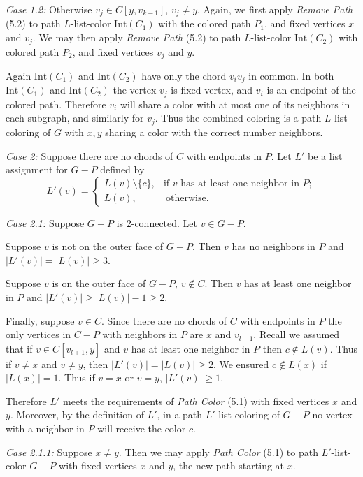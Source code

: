 \documentclass[letterpaper, 12pt]{article}
\theoremstyle{thm}
\begin{document}
\textit{Case 1.2:} Otherwise $v_j\in C[y,v_{k-1}]$, $v_j\ne y$. Again, we first
apply \textit{Remove Path} (5.2) to path $L$-list-color $\text{Int}(C_1)$ with
the colored path $P_1$, and fixed vertices $x$ and $v_j$.
We may then apply \textit{Remove Path} (5.2) to path $L$-list-color
$\text{Int}(C_2)$ with colored path $P_2$, and fixed vertices $v_j$ and $y$.

Again $\text{Int}(C_1)$ and $\text{Int}(C_2)$ have only the chord $v_iv_j$ in
common. In both $\text{Int}(C_1)$ and $\text{Int}(C_2)$ the vertex $v_j$ is
fixed vertex, and $v_i$ is an endpoint of the colored path. Therefore $v_i$ will
share a color with at most one of its neighbors in each subgraph, and similarly
for $v_j$. Thus the
combined coloring is a path $L$-list-coloring of $G$ with $x,y$ sharing a color
with the correct number neighbors.

\textit{Case 2:} Suppose there are no chords of $C$ with endpoints in $P$.
Let $L'$ be a list assignment for $G-P$ defined by
\[
	L'(v) = \begin{cases}
				L(v)\setminus\{c\}, & \text{if } v \text{ has at least one
				    neighbor in } P;\\
				L(v), & \ \text{otherwise}.
			\end{cases}
\]

\textit{Case 2.1:} Suppose $G-P$ is $2$-connected. Let $v\in G-P$.

Suppose $v$ is not on the outer face of $G-P$. Then $v$ has no neighbors in $P$
and $|L'(v)|=\big|L(v)\big|\ge 3$.

Suppose $v$ is on the outer face of $G-P$, $v\not\in C$. Then $v$ has at
least one neighbor in $P$ and $|L'(v)|\ge \big|L(v)\big|-1\ge 2$.

Finally, suppose $v\in C$. Since there are no chords of $C$ with endpoints in
$P$ the only vertices in $C-P$ with neighbors in $P$ are $x$ and $v_{l+1}$.
Recall we assumed that if $v\in C[v_{l+1},y]$ and $v$ has at least one neighbor
in $P$ then $c\not\in L(v)$. Thus if $v\ne x$ and $v\ne y$, then
$|L'(v)|=\big|L(v)\big|\ge 2$. We ensured $c\not\in L(x)$ if $\big|L(x)\big|=1$. Thus if $v=x$
or $v=y$, $|L'(v)|\ge 1$.

Therefore $L'$ meets the requirements of \textit{Path Color}
(5.1) with fixed vertices $x$ and $y$. Moreover, by the definition of $L'$, in
a path $L'$-list-coloring of $G-P$ no vertex with a neighbor in $P$ will receive
the color $c$.

\textit{Case 2.1.1:} Suppose $x\ne y$. Then we may apply \textit{Path Color}
(5.1) to path $L'$-list-color $G-P$ with fixed vertices $x$ and $y$, the new
path starting at $x$.
\end{document}
